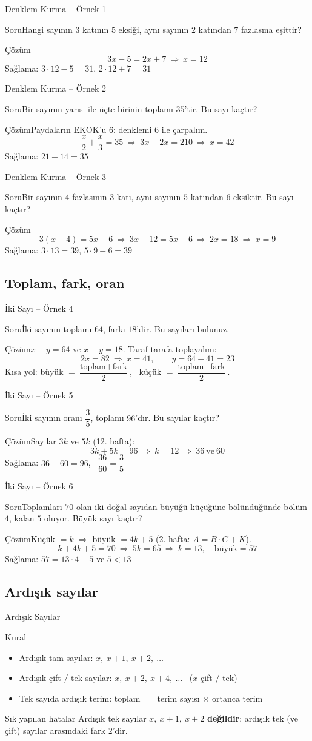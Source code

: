 \documentclass[aspectratio=169,11pt,handout]{beamer}
\newcommand{\soru}[3]{%
\begin{frame}{#1}
  \begin{block}{Soru}\large #2\end{block}
  \pause
  \begin{exampleblock}{Çözüm}\large #3\end{exampleblock}
\end{frame}}
\begin{document}
\soru{Denklem Kurma -- Örnek 1}
{Hangi sayının \(3\) katının \(5\) eksiği, aynı sayının \(2\) katından \(7\) fazlasına eşittir?}
{\[3x-5=2x+7\ \Rightarrow\ x=12\]
Sağlama: \(3\cdot 12-5=31\), \quad \(2\cdot 12+7=31\) \checkmark}

\soru{Denklem Kurma -- Örnek 2}
{Bir sayının yarısı ile üçte birinin toplamı \(35\)'tir. Bu sayı kaçtır?}
{Paydaların EKOK'u \(6\): denklemi \(6\) ile çarpalım.
\[\frac{x}{2}+\frac{x}{3}=35\ \Rightarrow\ 3x+2x=210\ \Rightarrow\ x=42\]
Sağlama: \(21+14=35\) \checkmark}

\soru{Denklem Kurma -- Örnek 3}
{Bir sayının \(4\) fazlasının \(3\) katı, aynı sayının \(5\) katından \(6\) eksiktir. Bu sayı kaçtır?}
{\[3(x+4)=5x-6\ \Rightarrow\ 3x+12=5x-6\ \Rightarrow\ 2x=18\ \Rightarrow\ x=9\]
Sağlama: \(3\cdot 13=39\), \quad \(5\cdot 9-6=39\) \checkmark}

\subsection{Toplam, fark, oran}
\soru{İki Sayı -- Örnek 4}
{İki sayının toplamı \(64\), farkı \(18\)'dir. Bu sayıları bulunuz.}
{\(x+y=64\) ve \(x-y=18\). Taraf tarafa toplayalım:
\[2x=82\ \Rightarrow\ x=41,\qquad y=64-41=23\]
Kısa yol: büyük \(=\dfrac{\text{toplam}+\text{fark}}{2}\), \ küçük \(=\dfrac{\text{toplam}-\text{fark}}{2}\).}

\soru{İki Sayı -- Örnek 5}
{İki sayının oranı \(\dfrac{3}{5}\), toplamı \(96\)'dır. Bu sayılar kaçtır?}
{Sayılar \(3k\) ve \(5k\) (12. hafta):
\[3k+5k=96\ \Rightarrow\ k=12\ \Rightarrow\ 36\ \text{ve}\ 60\]
Sağlama: \(36+60=96\), \ \(\dfrac{36}{60}=\dfrac{3}{5}\) \checkmark}

\soru{İki Sayı -- Örnek 6}
{Toplamları \(70\) olan iki doğal sayıdan büyüğü küçüğüne bölündüğünde bölüm \(4\), kalan \(5\) oluyor. Büyük sayı kaçtır?}
{Küçük \(=k\) \(\Rightarrow\) büyük \(=4k+5\) (2. hafta: \(A=B\cdot C+K\)).
\[k+4k+5=70\ \Rightarrow\ 5k=65\ \Rightarrow\ k=13,\quad \text{büyük}=57\]
Sağlama: \(57=13\cdot 4+5\) ve \(5<13\) \checkmark}

\subsection{Ardışık sayılar}
\begin{frame}{Ardışık Sayılar}
\begin{block}{Kural}
\begin{itemize}
\item Ardışık tam sayılar: \(x,\ x+1,\ x+2,\ \dots\)
\item Ardışık çift / tek sayılar: \(x,\ x+2,\ x+4,\ \dots\) \ (\(x\) çift / tek)
\item Tek sayıda ardışık terim: toplam \(=\) terim sayısı \(\times\) ortanca terim
\end{itemize}
\end{block}
\begin{alertblock}{Sık yapılan hatalar}
Ardışık tek sayılar \(x,\ x+1,\ x+2\) \textbf{değildir}; ardışık tek (ve çift) sayılar arasındaki fark \(2\)'dir.
\end{alertblock}
\end{frame}
\end{document}
